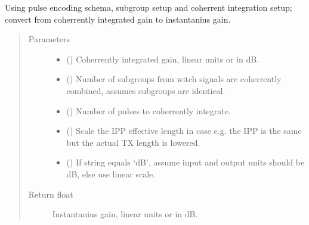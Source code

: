\documentclass[letterpaper,10pt,english]{sphinxmanual}
\begin{document}
\begin{fulllineitems}
\label{\detokenize{modules/antenna:antenna.full_gain2inst_gain}}
Using pulse encoding schema, subgroup setup and coherrent integration setup; convert from coherrently integrated gain to instantanius gain.
\begin{quote}\begin{description}
\item[{Parameters}] \leavevmode\begin{itemize}
\item {} 
 () \textendash{} Coherrently integrated gain, linear units or in dB.

\item {} 
 () \textendash{} Number of subgroups from witch signals are coherrently combined, assumes subgroups are identical.

\item {} 
 () \textendash{} Number of pulses to coherrently integrate.

\item {} 
 () \textendash{} Scale the IPP effective length in case e.g. the IPP is the same but the actual TX length is lowered.

\item {} 
 () \textendash{} If string equals ‘dB’, assume input and output units should be dB, else use linear scale.

\end{itemize}

\item[{Return float}] \leavevmode
Instantanius gain, linear units or in dB.

\end{description}\end{quote}

\end{fulllineitems}
\end{document}
